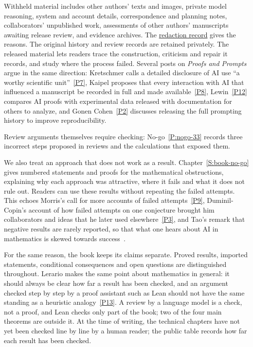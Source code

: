 Withheld material includes other authors' texts and images, private model
reasoning, system and account details, correspondence and planning notes,
collaborators' unpublished work, assessments of other authors' manuscripts
awaiting release review, and evidence archives. The
\href{https://github.com/chenle02/stratonovich-ham-second-moment/blob/v1.2.0/REDACTIONS.md}{redaction record}
gives the reasons. The original history and review records are retained
privately. The released material lets readers trace the construction,
criticism and repair it records, and study where the process failed.
Several posts on
\emph{Proofs and Prompts} argue in the same direction: Kretschmer calls a
detailed disclosure of AI use ``a worthy scientific
unit''~\hyperlink{pp:P7}{[P7]}, Kaipel proposes that every interaction with AI
that influenced a manuscript be recorded in full and made
available~\hyperlink{pp:P8}{[P8]}, Lewin~\hyperlink{pp:P12}{[P12]} compares AI
proofs with experimental data released with documentation for others to
analyze, and Gonen Cohen~\hyperlink{pp:P2}{[P2]} discusses releasing the full
prompting history to improve reproducibility.

Review arguments themselves require checking: No-go~\ref{P:nogo-33}
records three incorrect steps proposed in reviews and the calculations
that exposed them.

We also treat an approach that does not work as a result.
Chapter~\ref{S:book-no-go} gives numbered statements and proofs for the
mathematical obstructions, explaining why each approach was attractive,
where it fails and what it does not rule out. Readers can use these results
without repeating the failed attempts. This echoes
Morris's call for more accounts of failed attempts~\hyperlink{pp:P9}{[P9]},
Duminil-Copin's account of how failed attempts on one conjecture brought him
collaborators and ideas that he later used elsewhere~\hyperlink{pp:P3}{[P3]},
and Tao's remark that negative results are rarely reported, so that what one
hears about AI in mathematics is skewed towards success~\cite{tao:26:post}.

For the same reason, the book keeps its claims separate. Proved results, imported
statements, conditional consequences and open questions are distinguished
throughout. Lerario makes the same point about mathematics in general: it should
always be clear how far a result has been checked, and an argument checked step
by step by a proof assistant such as Lean should not have the same standing as a
heuristic analogy~\hyperlink{pp:P13}{[P13]}. A review by a language model is a
check, not a proof, and Lean checks only part of the book; two of the four main theorems are outside it. At the time of writing, the technical chapters have not yet been
checked line by line by a human reader; the public table records how far each
result has been checked.

